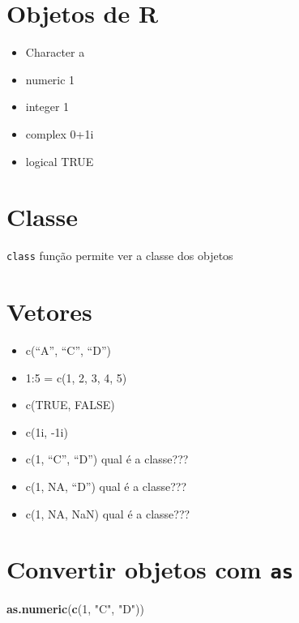 \documentclass[]{book}
\newenvironment{Shaded}{\begin{snugshade}}{\end{snugshade}}
\newcommand{\KeywordTok}[1]{\textcolor[rgb]{0.13,0.29,0.53}{\textbf{#1}}}
\newcommand{\DecValTok}[1]{\textcolor[rgb]{0.00,0.00,0.81}{#1}}
\newcommand{\StringTok}[1]{\textcolor[rgb]{0.31,0.60,0.02}{#1}}
\newcommand{\NormalTok}[1]{#1}
\providecommand{\tightlist}{%
  \setlength{\itemsep}{0pt}\setlength{\parskip}{0pt}}
\theoremstyle{definition}
\theoremstyle{definition}
\theoremstyle{definition}
\theoremstyle{remark}
\begin{document}
\section{Objetos de R}\label{objetos-de-r}

\begin{itemize}
\tightlist
\item
  Character a
\item
  numeric 1
\item
  integer 1
\item
  complex 0+1i
\item
  logical TRUE
\end{itemize}

\section{Classe}\label{classe}

\texttt{class} função permite ver a classe dos objetos

\section{Vetores}\label{vetores}

\begin{itemize}
\tightlist
\item
  c(``A'', ``C'', ``D'')
\item
  1:5 = c(1, 2, 3, 4, 5)
\item
  c(TRUE, FALSE)
\item
  c(1i, -1i)
\item
  c(1, ``C'', ``D'') qual é a classe???
\item
  c(1, NA, ``D'') qual é a classe???
\item
  c(1, NA, NaN) qual é a classe???
\end{itemize}

\section{\texorpdfstring{Convertir objetos com
\texttt{as}}{Convertir objetos com as}}\label{convertir-objetos-com-as}

\begin{Shaded}
\begin{Highlighting}[]
\KeywordTok{as.numeric}\NormalTok{(}\KeywordTok{c}\NormalTok{(}\DecValTok{1}\NormalTok{, }\StringTok{"C"}\NormalTok{, }\StringTok{"D"}\NormalTok{))}
\end{Highlighting}
\end{Shaded}
\end{document}
